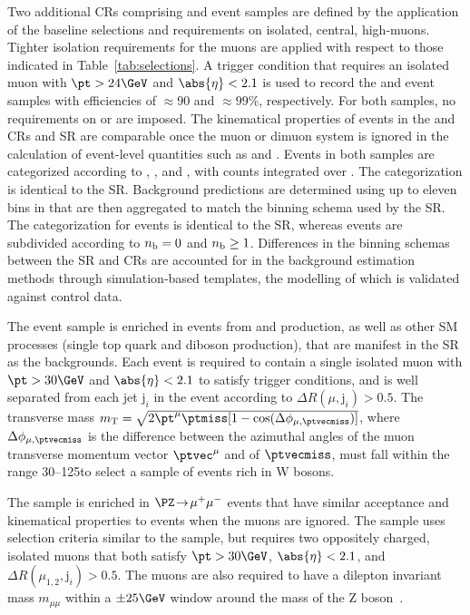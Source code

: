 Two additional CRs comprising \mj and \mmj event samples are defined
by the application of the baseline selections and requirements on
isolated, central, high-\pt muons. Tighter isolation requirements for
the muons are applied with respect to those indicated in
Table~\ref{tab:selections}.  A trigger condition that requires an
isolated muon with $\pt > 24\GeV$ and $\abs{\eta} < 2.1$ is used to
record the \mj and \mmj event samples with efficiencies of
${\approx}90$ and ${\approx}99\%$, respectively. For both samples, no
requirements on \alphat or \bdphi are imposed. The kinematical
properties of events in the \mj and \mmj CRs and SR are comparable
once the muon or dimuon system is ignored in the calculation of
event-level quantities such as \scalht and \mht.  Events in both
samples are categorized according to \njet, \scalht, and \nb, with
counts integrated over \mht. The \njet categorization is identical to
the SR. Background predictions are determined using up to eleven bins
in \scalht that are then aggregated to match the \scalht binning
schema used by the SR. The \nb categorization for \mj events is
identical to the SR, whereas \mmj events are subdivided according to
$n_{\mathrm{b}} = 0$ and $n_{\mathrm{b}} \geq 1$. Differences in the binning schemas between
the SR and CRs are accounted for in the background estimation methods
through simulation-based templates, the modelling of which is
validated against control data.

The \mj event sample is enriched in events from \wmj and \ttbar
production, as well as other SM processes (\eg single top quark and
diboson production), that are manifest in the SR as the \lost
backgrounds. Each event is required to contain a single isolated muon
with $\pt > 30\GeV$ and $\abs{\eta} < 2.1$ to satisfy trigger
conditions, and is well separated from each jet $\mathrm{j}_i$ in the
event according to ${\Delta}R(\mu,\mathrm{j}_i) > 0.5$. The transverse
mass $m_\mathrm{T} = \sqrt{2\pt^\mu\ptmiss[1-
  \cos(\Delta\phi_{\mu,\ptvecmiss})]}$, where
$\Delta\phi_{\mu,\ptvecmiss}$ is the difference between the azimuthal
angles of the muon transverse momentum vector $\ptvec^\mu$ and of
$\ptvecmiss$, must fall within the range 30--125\GeV to select a
sample of events rich in W bosons.

The \mmj sample is enriched in $\PZ\! \to\!  \mu^+\mu^-$
events that have similar acceptance and kinematical properties to
\znunuj events when the muons are ignored. The sample uses selection
criteria similar to the \mj sample, but requires two oppositely
charged, isolated muons that both satisfy $\pt > 30\GeV$, $\abs{\eta}
< 2.1$, and ${\Delta}R(\mu_{1,2},\mathrm{j}_i) > 0.5$. The muons are
also required to have a dilepton invariant mass $m_{\mu\mu}$ within a
${\pm}25\GeV$ window around the mass of the Z
boson~\cite{Patrignani:2016xqp}.

